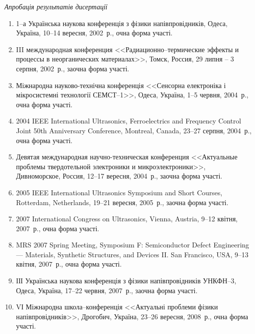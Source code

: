 \begin{center}%
\emph{Апробація результатів дисертації}
\end{center}%
\begin{enumerate}[label=\arabic*.,leftmargin=1em,itemindent=1em]

\item
1--а Українська наукова конференція з фізики напівпровідників, Одеса, Україна, 10--14 вересня, 2002~р., очна форма участі.

\item
III международная конференция <<Радиационно--термические эффекты и процессы в неорганических материалах>>, Томск, Россия, 29 липня -- 3 серпня, 2002~р., заочна форма участі.

\item
Міжнародна науково-технічна конференція <<Сенсорна електроніка і мікросистемні технології СЕМСТ--1>>, Одеса, Україна, 1--5 червня, 2004~р., очна форма участі.

\item
2004 IEEE International Ultrasonics, Ferroelectrics and Frequency Control Joint 50th Anniversary Conference, Montreal, Canada, 23--27 серпня, 2004~р., очна форма участі.

\item
Девятая международная научно-техническая конференция <<Актуальные проблемы твердотельной электроники и микроэлектроники>>, Дивноморское, Россия, 12--17 вересня, 2004~р., заочна форма участі.

\item
2005 IEEE International Ultrasonics Symposium and Short Courses, Rotterdam, Netherlands, 19--21 вересня, 2005~р., заочна форма участі.

\item
2007 International Congress on Ultrasonics, Vienna, Austria, 9--12 квітня, 2007~р., очна форма участі.

\item
MRS 2007 Spring Meeting, Symposium F: Semiconductor Defect Engineering --- Materials, Synthetic Structures, and Devices II. San Francisco, USA, 9--13 квітня, 2007~р., очна форма участі.

\item
ІІІ Українська наукова конференція з фізики напівпровідників УНКФН--3, Одеса, Україна, 17--22 червня, 2007~р., заочна форма участі.

\item
VІ Міжнародна школа--конференція <<Актуальні проблеми фізики напівпровідників>>, Дрогобич, Україна, 23--26 вересня, 2008~р., очна форма участі.


\end{enumerate}
